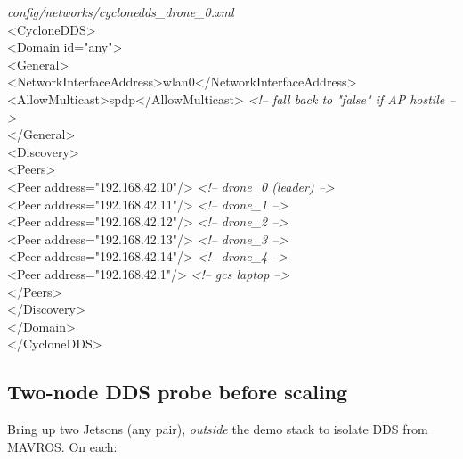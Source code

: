 \documentclass[11pt,a4paper]{article}
\begin{document}
\begin{center}
\begin{tcolorbox}[colback=bggrey, colframe=fcblue!60, boxrule=0.6pt, arc=2pt,
                  width=15cm, fontupper=\scriptsize\ttfamily]
\textcolor{linegrey}{\itshape config/networks/cyclonedds\_drone\_0.xml}\\[2pt]
<CycloneDDS>\\
\quad<Domain id="any">\\
\quad\quad<General>\\
\quad\quad\quad<NetworkInterfaceAddress>wlan0</NetworkInterfaceAddress>\\
\quad\quad\quad<AllowMulticast>spdp</AllowMulticast>  \textcolor{linegrey}{\itshape <!-- fall back to "false" if AP hostile -->}\\
\quad\quad</General>\\
\quad\quad<Discovery>\\
\quad\quad\quad<Peers>\\
\quad\quad\quad\quad<Peer address="192.168.42.10"/>  \textcolor{linegrey}{\itshape <!-- drone\_0 (leader) -->}\\
\quad\quad\quad\quad<Peer address="192.168.42.11"/>  \textcolor{linegrey}{\itshape <!-- drone\_1 -->}\\
\quad\quad\quad\quad<Peer address="192.168.42.12"/>  \textcolor{linegrey}{\itshape <!-- drone\_2 -->}\\
\quad\quad\quad\quad<Peer address="192.168.42.13"/>  \textcolor{linegrey}{\itshape <!-- drone\_3 -->}\\
\quad\quad\quad\quad<Peer address="192.168.42.14"/>  \textcolor{linegrey}{\itshape <!-- drone\_4 -->}\\
\quad\quad\quad\quad<Peer address="192.168.42.1"/>   \textcolor{linegrey}{\itshape <!-- gcs laptop -->}\\
\quad\quad\quad</Peers>\\
\quad\quad</Discovery>\\
\quad</Domain>\\
</CycloneDDS>
\end{tcolorbox}
\end{center}

\subsection{Two-node DDS probe before scaling}

Bring up two Jetsons (any pair), \emph{outside} the demo stack to isolate DDS
from MAVROS. On each:
\end{document}
